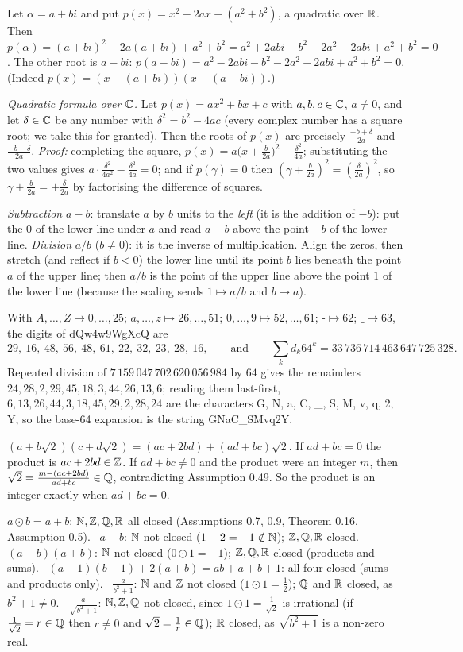  Let $\alpha=a+bi$ and put $p(x)=x^2-2ax+(a^2+b^2)$, a quadratic over $\mathbb{R}$. Then $p(\alpha)=(a+bi)^2-2a(a+bi)+a^2+b^2=a^2+2abi-b^2-2a^2-2abi+a^2+b^2=0$. The other root is $a-bi$: $p(a-bi)=a^2-2abi-b^2-2a^2+2abi+a^2+b^2=0$. (Indeed $p(x)=(x-(a+bi))(x-(a-bi))$.)

 \emph{Quadratic formula over $\mathbb{C}$.} Let $p(x)=ax^2+bx+c$ with $a,b,c\in\mathbb{C}$, $a\ne0$, and let $\delta\in\mathbb{C}$ be any number with $\delta^2=b^2-4ac$ (every complex number has a square root; we take this for granted). Then the roots of $p(x)$ are precisely $\frac{-b+\delta}{2a}$ and $\frac{-b-\delta}{2a}$. \emph{Proof:} completing the square, $p(x)=a\big(x+\frac b{2a}\big)^2-\frac{\delta^2}{4a}$; substituting the two values gives $a\cdot\frac{\delta^2}{4a^2}-\frac{\delta^2}{4a}=0$; and if $p(\gamma)=0$ then $(\gamma+\frac b{2a})^2=(\frac\delta{2a})^2$, so $\gamma+\frac b{2a}=\pm\frac\delta{2a}$ by factorising the difference of squares.

 \emph{Subtraction} $a-b$: translate $a$ by $b$ units to the \emph{left} (it is the addition of $-b$): put the $0$ of the lower line under $a$ and read $a-b$ above the point $-b$ of the lower line. \emph{Division} $a/b$ ($b\ne0$): it is the inverse of multiplication. Align the zeros, then stretch (and reflect if $b<0$) the lower line until its point $b$ lies beneath the point $a$ of the upper line; then $a/b$ is the point of the upper line above the point $1$ of the lower line (because the scaling sends $1\mapsto a/b$ and $b\mapsto a$).

 With $A,\dots,Z\mapsto0,\dots,25$; $a,\dots,z\mapsto26,\dots,51$; $0,\dots,9\mapsto52,\dots,61$; $\text{-}\mapsto62$; $\_\mapsto63$, the digits of dQw4w9WgXcQ are
\[
29,\ 16,\ 48,\ 56,\ 48,\ 61,\ 22,\ 32,\ 23,\ 28,\ 16,\qquad\text{and}\qquad \sum_kd_k64^k=33\,736\,714\,463\,647\,725\,328 .
\]
Repeated division of $7\,159\,047\,702\,620\,056\,984$ by $64$ gives the remainders $24,28,2,29,45,18,3,44,26,13,6$; reading them last-first, $6,13,26,44,3,18,45,29,2,28,24$ are the characters G, N, a, C, \_, S, M, v, q, 2, Y, so the base-64 expansion is the string GNaC\_SMvq2Y.

 $(a+b\sqrt2)(c+d\sqrt2)=(ac+2bd)+(ad+bc)\sqrt2$. If $ad+bc=0$ the product is $ac+2bd\in\mathbb{Z}$. If $ad+bc\ne0$ and the product were an integer $m$, then $\sqrt2=\frac{m-(ac+2bd)}{ad+bc}\in\mathbb{Q}$, contradicting Assumption 0.49. So the product is an integer exactly when $ad+bc=0$.

 $a\odot b=a+b$: $\mathbb{N},\mathbb{Z},\mathbb{Q},\mathbb{R}$ all closed (Assumptions 0.7, 0.9, Theorem 0.16, Assumption 0.5). \ $a-b$: $\mathbb{N}$ not closed ($1-2=-1\notin\mathbb{N}$); $\mathbb{Z},\mathbb{Q},\mathbb{R}$ closed. \ $(a-b)(a+b)$: $\mathbb{N}$ not closed ($0\odot1=-1$); $\mathbb{Z},\mathbb{Q},\mathbb{R}$ closed (products and sums). \ $(a-1)(b-1)+2(a+b)=ab+a+b+1$: all four closed (sums and products only). \ $\frac a{b^2+1}$: $\mathbb{N}$ and $\mathbb{Z}$ not closed ($1\odot1=\frac12$); $\mathbb{Q}$ and $\mathbb{R}$ closed, as $b^2+1\ne0$. \ $\frac a{\sqrt{b^2+1}}$: $\mathbb{N},\mathbb{Z},\mathbb{Q}$ not closed, since $1\odot1=\frac1{\sqrt2}$ is irrational (if $\frac1{\sqrt2}=r\in\mathbb{Q}$ then $r\ne0$ and $\sqrt2=\frac1r\in\mathbb{Q}$); $\mathbb{R}$ closed, as $\sqrt{b^2+1}$ is a non-zero real.

